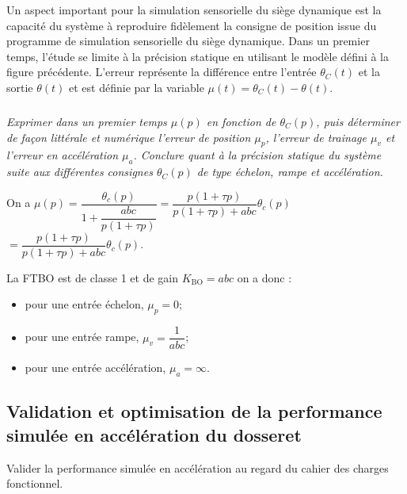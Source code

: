\begin{multicols}{2}
Un aspect important pour la simulation sensorielle du siège dynamique
est la capacité du système à reproduire fidèlement la consigne de
position issue du programme de simulation sensorielle du siège
dynamique. Dans un premier temps, l'étude se limite à la précision
statique en utilisant le modèle défini à la figure précédente. L'erreur
représente la différence entre l'entrée $\theta_C(t)$ et la
sortie $\theta(t)$ et est définie par la variable $\mu(t) = \theta_C(t)-\theta(t)$.
\fi


\subparagraph{}\textit{ Exprimer dans un premier temps $\mu(p)$ en fonction de
  $\theta_C(p)$, puis déterminer de façon littérale et numérique
  l'erreur de position $\mu_p$, l'erreur de trainage
  $\mu_v$ et l'erreur en accélération $\mu_a$.
  Conclure quant à la précision statique du système suite aux
  différentes consignes $\theta_C(p)$ de type échelon, rampe et
  accélération.}

\ifprof
\begin{corrige}
On a $\mu(p)=\dfrac{\theta_c(p)}{1+\dfrac{abc}{p\left( 1+\tau p\right)}}=\dfrac{p\left( 1+\tau p\right)}{p\left( 1+\tau p\right)+abc}\theta_c(p)$ $=\dfrac{p\left( 1+\tau p\right)}{p\left( 1+\tau p\right)+abc}\theta_c(p)$.

La FTBO est de classe 1 et de gain $K_{\text{BO}}={abc}$ on a donc : 
\begin{itemize}
\item pour une entrée échelon, $\mu_p = 0$;
\item pour une entrée rampe, $\mu_v = \dfrac{1}{abc}$;
\item pour une entrée accélération, $\mu_a = \infty$.
\end{itemize}
\end{corrige}
\else
\fi

\subsection*{Validation et optimisation de la performance simulée en
accélération du dosseret}

\begin{obj}
Valider la performance simulée en accélération au regard du cahier des
charges fonctionnel.
\end{obj}
%
%



\end{multicols}
